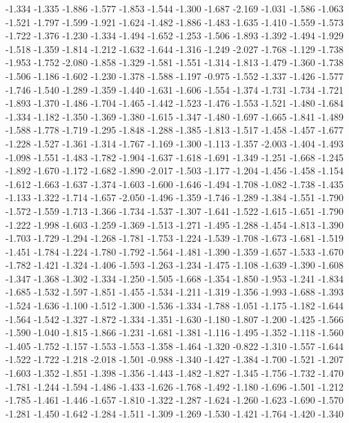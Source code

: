 \documentclass[9pt]{article}
\theoremstyle{plain}
\theoremstyle{definition}
\theoremstyle{remark}
\numberwithin{equation}{section}
\begin{document}
-1.334
-1.335
-1.886
-1.577
-1.853
-1.544
-1.300
-1.687
-2.169
-1.031
-1.586
-1.063
-1.521
-1.797
-1.599
-1.921
-1.624
-1.482
-1.886
-1.483
-1.635
-1.410
-1.559
-1.573
-1.722
-1.376
-1.230
-1.334
-1.494
-1.652
-1.253
-1.506
-1.893
-1.392
-1.494
-1.929
-1.518
-1.359
-1.814
-1.212
-1.632
-1.644
-1.316
-1.249
-2.027
-1.768
-1.129
-1.738
-1.953
-1.752
-2.080
-1.858
-1.329
-1.581
-1.551
-1.314
-1.813
-1.479
-1.360
-1.738
-1.506
-1.186
-1.602
-1.230
-1.378
-1.588
-1.197
-0.975
-1.552
-1.337
-1.426
-1.577
-1.746
-1.540
-1.289
-1.359
-1.440
-1.631
-1.606
-1.554
-1.374
-1.731
-1.734
-1.721
-1.893
-1.370
-1.486
-1.704
-1.465
-1.442
-1.523
-1.476
-1.553
-1.521
-1.480
-1.684
-1.334
-1.182
-1.350
-1.369
-1.380
-1.615
-1.347
-1.480
-1.697
-1.665
-1.841
-1.489
-1.588
-1.778
-1.719
-1.295
-1.848
-1.288
-1.385
-1.813
-1.517
-1.458
-1.457
-1.677
-1.228
-1.527
-1.361
-1.314
-1.767
-1.169
-1.300
-1.113
-1.357
-2.003
-1.404
-1.493
-1.098
-1.551
-1.483
-1.782
-1.904
-1.637
-1.618
-1.691
-1.349
-1.251
-1.668
-1.245
-1.892
-1.670
-1.172
-1.682
-1.890
-2.017
-1.503
-1.177
-1.204
-1.456
-1.458
-1.154
-1.612
-1.663
-1.637
-1.374
-1.603
-1.600
-1.646
-1.494
-1.708
-1.082
-1.738
-1.435
-1.133
-1.322
-1.714
-1.657
-2.050
-1.496
-1.359
-1.746
-1.289
-1.384
-1.551
-1.790
-1.572
-1.559
-1.713
-1.366
-1.734
-1.537
-1.307
-1.641
-1.522
-1.615
-1.651
-1.790
-1.222
-1.998
-1.603
-1.259
-1.369
-1.513
-1.271
-1.495
-1.288
-1.454
-1.813
-1.390
-1.703
-1.729
-1.294
-1.268
-1.781
-1.753
-1.224
-1.539
-1.708
-1.673
-1.681
-1.519
-1.451
-1.784
-1.224
-1.780
-1.792
-1.564
-1.481
-1.390
-1.359
-1.657
-1.533
-1.670
-1.782
-1.421
-1.324
-1.406
-1.593
-1.263
-1.234
-1.475
-1.108
-1.639
-1.390
-1.608
-1.347
-1.368
-1.302
-1.334
-1.250
-1.505
-1.668
-1.354
-1.850
-1.953
-1.241
-1.834
-1.685
-1.532
-1.597
-1.851
-1.455
-1.534
-1.211
-1.319
-1.356
-1.993
-1.688
-1.393
-1.524
-1.636
-1.100
-1.512
-1.300
-1.536
-1.334
-1.788
-1.051
-1.175
-1.182
-1.644
-1.564
-1.542
-1.327
-1.872
-1.334
-1.351
-1.630
-1.180
-1.807
-1.200
-1.425
-1.566
-1.590
-1.040
-1.815
-1.866
-1.231
-1.681
-1.381
-1.116
-1.495
-1.352
-1.118
-1.560
-1.405
-1.752
-1.157
-1.553
-1.553
-1.358
-1.464
-1.320
-0.822
-1.310
-1.557
-1.644
-1.522
-1.722
-1.218
-2.018
-1.501
-0.988
-1.340
-1.427
-1.384
-1.700
-1.521
-1.207
-1.603
-1.352
-1.851
-1.398
-1.356
-1.443
-1.482
-1.827
-1.345
-1.756
-1.732
-1.470
-1.781
-1.244
-1.594
-1.486
-1.433
-1.626
-1.768
-1.492
-1.180
-1.696
-1.501
-1.212
-1.785
-1.461
-1.446
-1.657
-1.810
-1.322
-1.287
-1.624
-1.260
-1.623
-1.690
-1.570
-1.281
-1.450
-1.642
-1.284
-1.511
-1.309
-1.269
-1.530
-1.421
-1.764
-1.420
-1.340
\end{document}
